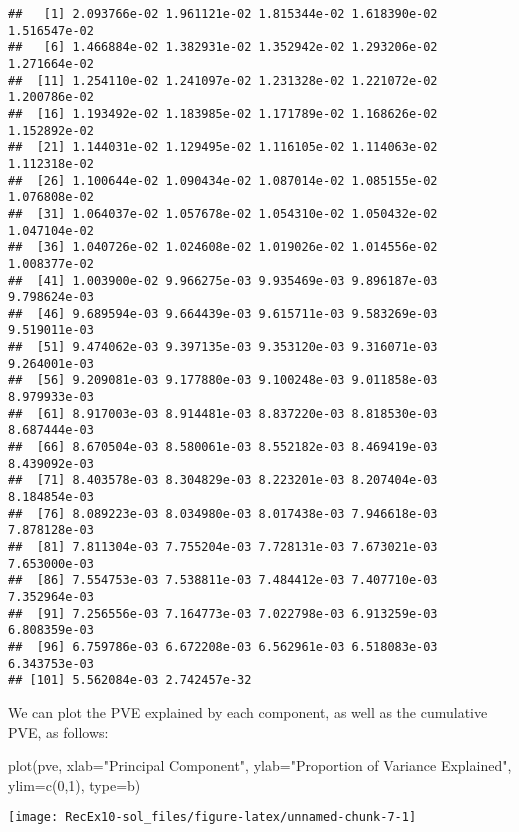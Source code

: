\documentclass[
]{article}
\newenvironment{Shaded}{\begin{snugshade}}{\end{snugshade}}
\newcommand{\AttributeTok}[1]{\textcolor[rgb]{0.77,0.63,0.00}{#1}}
\newcommand{\DecValTok}[1]{\textcolor[rgb]{0.00,0.00,0.81}{#1}}
\newcommand{\FunctionTok}[1]{\textcolor[rgb]{0.00,0.00,0.00}{#1}}
\newcommand{\NormalTok}[1]{#1}
\newcommand{\StringTok}[1]{\textcolor[rgb]{0.31,0.60,0.02}{#1}}
\begin{document}
\begin{verbatim}
##   [1] 2.093766e-02 1.961121e-02 1.815344e-02 1.618390e-02 1.516547e-02
##   [6] 1.466884e-02 1.382931e-02 1.352942e-02 1.293206e-02 1.271664e-02
##  [11] 1.254110e-02 1.241097e-02 1.231328e-02 1.221072e-02 1.200786e-02
##  [16] 1.193492e-02 1.183985e-02 1.171789e-02 1.168626e-02 1.152892e-02
##  [21] 1.144031e-02 1.129495e-02 1.116105e-02 1.114063e-02 1.112318e-02
##  [26] 1.100644e-02 1.090434e-02 1.087014e-02 1.085155e-02 1.076808e-02
##  [31] 1.064037e-02 1.057678e-02 1.054310e-02 1.050432e-02 1.047104e-02
##  [36] 1.040726e-02 1.024608e-02 1.019026e-02 1.014556e-02 1.008377e-02
##  [41] 1.003900e-02 9.966275e-03 9.935469e-03 9.896187e-03 9.798624e-03
##  [46] 9.689594e-03 9.664439e-03 9.615711e-03 9.583269e-03 9.519011e-03
##  [51] 9.474062e-03 9.397135e-03 9.353120e-03 9.316071e-03 9.264001e-03
##  [56] 9.209081e-03 9.177880e-03 9.100248e-03 9.011858e-03 8.979933e-03
##  [61] 8.917003e-03 8.914481e-03 8.837220e-03 8.818530e-03 8.687444e-03
##  [66] 8.670504e-03 8.580061e-03 8.552182e-03 8.469419e-03 8.439092e-03
##  [71] 8.403578e-03 8.304829e-03 8.223201e-03 8.207404e-03 8.184854e-03
##  [76] 8.089223e-03 8.034980e-03 8.017438e-03 7.946618e-03 7.878128e-03
##  [81] 7.811304e-03 7.755204e-03 7.728131e-03 7.673021e-03 7.653000e-03
##  [86] 7.554753e-03 7.538811e-03 7.484412e-03 7.407710e-03 7.352964e-03
##  [91] 7.256556e-03 7.164773e-03 7.022798e-03 6.913259e-03 6.808359e-03
##  [96] 6.759786e-03 6.672208e-03 6.562961e-03 6.518083e-03 6.343753e-03
## [101] 5.562084e-03 2.742457e-32
\end{verbatim}

We can plot the PVE explained by each component, as well as the
cumulative PVE, as follows:

\begin{Shaded}
\begin{Highlighting}[]
\FunctionTok{plot}\NormalTok{(pve, }
     \AttributeTok{xlab=}\StringTok{"Principal Component"}\NormalTok{, }
     \AttributeTok{ylab=}\StringTok{"Proportion of Variance Explained"}\NormalTok{, }
     \AttributeTok{ylim=}\FunctionTok{c}\NormalTok{(}\DecValTok{0}\NormalTok{,}\DecValTok{1}\NormalTok{),}
     \AttributeTok{type=}\StringTok{\textquotesingle{}b\textquotesingle{}}\NormalTok{)}
\end{Highlighting}
\end{Shaded}

\begin{center}\texttt{[image: RecEx10-sol\_files/figure-latex/unnamed-chunk-7-1]} \end{center}
\end{document}
